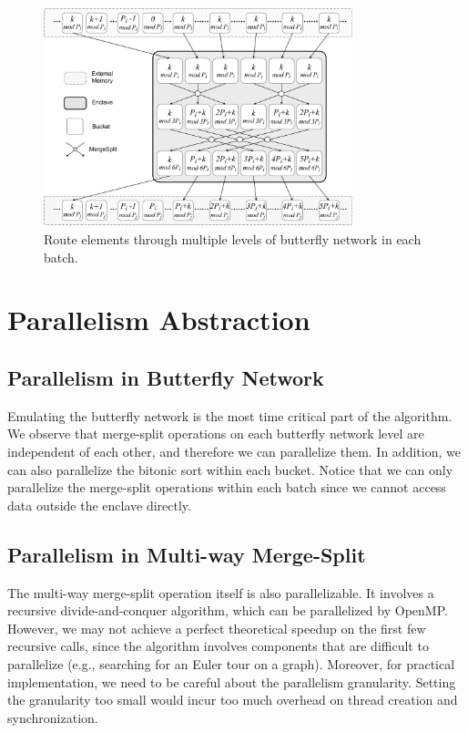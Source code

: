 \documentclass{article}
\begin{document}
\begin{figure}[thbp]
    \centering
    \includegraphics[width=0.8\textwidth]{assets/batch.png}
    \caption{Route elements through multiple levels of butterfly network in each batch.}
    \label{fig:batch}
\end{figure}

\section{Parallelism Abstraction}
\subsection{Parallelism in Butterfly Network}
Emulating the butterfly network is the most time critical part of the algorithm. We observe that merge-split operations on each butterfly network level are independent of each other, and therefore we can parallelize them. In addition, we can also parallelize the bitonic sort within each bucket. Notice that we can only parallelize the merge-split operations within each batch since we cannot access data outside the enclave directly.
\subsection{Parallelism in Multi-way Merge-Split}
The multi-way merge-split operation itself is also parallelizable. It involves a recursive divide-and-conquer algorithm, which can be parallelized by OpenMP. However, we may not achieve a perfect theoretical speedup on the first few recursive calls, since the algorithm involves components that are difficult to parallelize (e.g., searching for an Euler tour on a graph). Moreover, for practical implementation, we need to be careful about the parallelism granularity. Setting the granularity too small would incur too much overhead on thread creation and synchronization.
\end{document}
